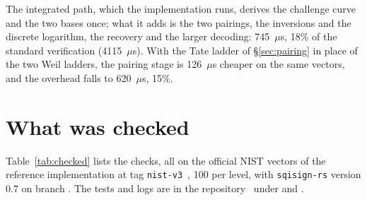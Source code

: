 \documentclass[version=preprint,notanonymous]{iacrcc}
\begin{document}
The integrated path, which the implementation runs, derives the
challenge curve and the two bases once; what it adds is the two pairings,
the inversions and the discrete logarithm, the recovery and the larger
decoding: 745~$\mu$s, 18\% of the standard verification
(4115~$\mu$s). With the Tate ladder of \S\ref{sec:pairing} in place of
the two Weil ladders, the pairing stage is 126~$\mu$s cheaper on the
same vectors, and the overhead falls to 620~$\mu$s, 15\%.

\section{What was checked}
\label{sec:checked}

Table~\ref{tab:checked} lists the checks, all on the official NIST
vectors of the reference implementation at tag
\texttt{nist-v3}~\cite{the-sqisign-v3}, 100 per level, with
\texttt{sqisign-rs} version 0.7 on branch .
The tests and logs are in the repository~\cite{sqisign-rs} under
 and
.
\end{document}

